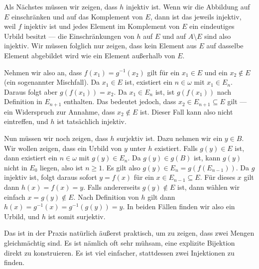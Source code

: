 \begin{spoken-clean}[00:29:10 - 00:30:49]
Als Nächstes müssen wir zeigen, dass $h$ injektiv ist. Wenn wir die Abbildung auf $E$ einschränken und auf das Komplement von $E$, dann ist das jeweils injektiv, weil $f$ injektiv ist und jedes Element im Komplement von $E$ ein eindeutiges Urbild besitzt --- die Einschränkungen von $h$ auf $E$ und auf $A \setminus E$ sind also injektiv. Wir müssen folglich nur zeigen, dass kein Element aus $E$ auf dasselbe Element abgebildet wird wie ein Element außerhalb von $E$.

Nehmen wir also an, dass $f(x_1) = g^{-1}(x_2)$ gilt für ein $x_1 \in E$ und ein $x_2 \notin E$ (ein sogenannter Mischfall). Da $x_1 \in E$ ist, existiert ein $n \in \omega$ mit $x_1 \in E_n$. Daraus folgt aber $g(f(x_1)) = x_2$. Da $x_1 \in E_n$ ist, ist $g(f(x_1))$ nach Definition in $E_{n+1}$ enthalten. Das bedeutet jedoch, dass $x_2 \in E_{n+1} \subseteq E$ gilt --- ein Widerspruch zur Annahme, dass $x_2 \notin E$ ist. Dieser Fall kann also nicht eintreffen, und $h$ ist tatsächlich injektiv.

Nun müssen wir noch zeigen, dass $h$ surjektiv ist. Dazu nehmen wir ein $y \in B$. Wir wollen zeigen, dass ein Urbild von $y$ unter $h$ existiert. Falls $g(y) \in E$ ist, dann existiert ein $n \in \omega$ mit $g(y) \in E_n$. Da $g(y) \in g(B)$ ist, kann $g(y)$ nicht in $E_0$ liegen, also ist $n \ge 1$. Es gilt also $g(y) \in E_n = g(f(E_{n-1}))$. Da $g$ injektiv ist, folgt daraus sofort $y = f(x)$ für ein $x \in E_{n-1} \subseteq E$. Für dieses $x$ gilt dann $h(x) = f(x) = y$. Falls andererseits $g(y) \notin E$ ist, dann wählen wir einfach $x = g(y) \notin E$. Nach Definition von $h$ gilt dann $h(x) = g^{-1}(x) = g^{-1}(g(y)) = y$. In beiden Fällen finden wir also ein Urbild, und $h$ ist somit surjektiv.

Das ist in der Praxis natürlich äußerst praktisch, um zu zeigen, dass zwei Mengen gleichmächtig sind. Es ist nämlich oft sehr mühsam, eine explizite Bijektion direkt zu konstruieren. Es ist viel einfacher, stattdessen zwei Injektionen zu finden.
\end{spoken-clean}

\newpage
